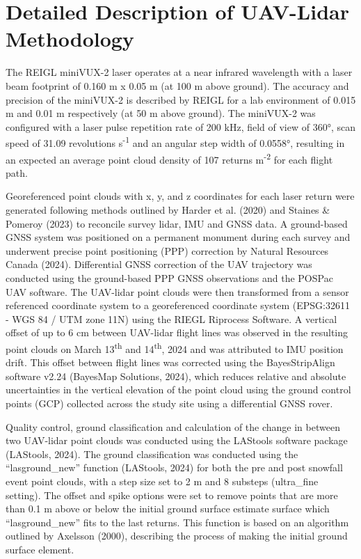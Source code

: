 \documentclass[
  letterpaper,
]{tex/uofsthesis-cs}
\begin{document}
\section{Detailed Description of UAV-Lidar
Methodology}\label{detailed-description-of-uav-lidar-methodology}

The REIGL miniVUX-2 laser operates at a near infrared wavelength with a
laser beam footprint of 0.160 m x 0.05 m (at 100 m above ground). The
accuracy and precision of the miniVUX-2 is described by REIGL for a lab
environment of 0.015 m and 0.01 m respectively (at 50 m above ground).
The miniVUX-2 was configured with a laser pulse repetition rate of 200
kHz, field of view of 360°, scan speed of 31.09 revolutions
s\textsuperscript{-1} and an angular step width of 0.0558°, resulting in
an expected an average point cloud density of 107 returns
m\textsuperscript{-2} for each flight path.

Georeferenced point clouds with x, y, and z coordinates for each laser
return were generated following methods outlined by Harder et al. (2020)
and Staines \& Pomeroy (2023) to reconcile survey lidar, IMU and GNSS
data. A ground-based GNSS system was positioned on a permanent monument
during each survey and underwent precise point positioning (PPP)
correction by Natural Resources Canada (2024). Differential GNSS
correction of the UAV trajectory was conducted using the ground-based
PPP GNSS observations and the POSPac UAV software. The UAV-lidar point
clouds were then transformed from a sensor referenced coordinate system
to a georeferenced coordinate system (EPSG:32611 - WGS 84 / UTM zone
11N) using the RIEGL Riprocess Software. A vertical offset of up to 6 cm
between UAV-lidar flight lines was observed in the resulting point
clouds on March 13\textsuperscript{th} and 14\textsuperscript{th}, 2024
and was attributed to IMU position drift. This offset between flight
lines was corrected using the BayesStripAlign software v2.24 (BayesMap
Solutions, 2024), which reduces relative and absolute uncertainties in
the vertical elevation of the point cloud using the ground control
points (GCP) collected across the study site using a differential GNSS
rover.

Quality control, ground classification and calculation of the change in
between two UAV-lidar point clouds was conducted using the LAStools
software package (LAStools, 2024). The ground classification was
conducted using the ``lasground\_new'' function (LAStools, 2024) for
both the pre and post snowfall event point clouds, with a step size set
to 2 m and 8 substeps (ultra\_fine setting). The offset and spike
options were set to remove points that are more than 0.1 m above or
below the initial ground surface estimate surface which
``lasground\_new'' fits to the last returns. This function is based on
an algorithm outlined by Axelsson (2000), describing the process of
making the initial ground surface element.
\end{document}
